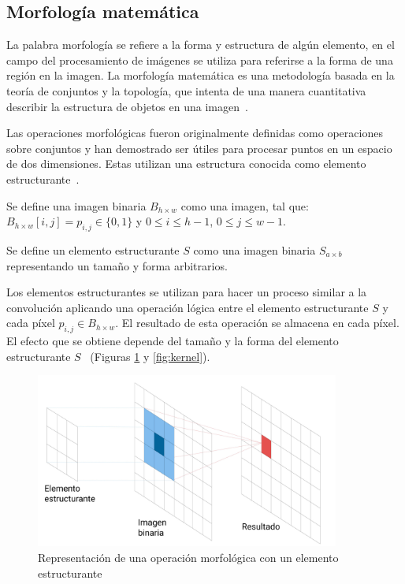 \subsection{Morfología matemática}

La palabra morfología se refiere a la forma y estructura de algún elemento, en el campo del procesamiento de imágenes se utiliza para referirse a la forma de una región en la imagen. La morfología matemática es una metodología basada en la teoría de conjuntos y la topología, que intenta de una manera cuantitativa describir la estructura de objetos en una imagen~\cite{bovik2009essential}.

Las operaciones morfológicas fueron originalmente definidas como operaciones sobre conjuntos y han demostrado ser útiles para procesar puntos en un espacio de dos dimensiones. Estas utilizan una estructura conocida como elemento estructurante~\cite{soille1999morphological, haralick1987image}.

\begin{definition}
	Se define una imagen binaria $B_{h \times w}$ como una imagen, tal que: $B_{h \times w}[i, j] = p_{i, j} \in \{0, 1\}$ y $0 \leq i \leq h - 1$, $ 0 \leq j \leq w-1$.
\end{definition}

\begin{definition}
	Se define un elemento estructurante $S$ como una imagen binaria $S_{a \times b}$ representando un tamaño y forma arbitrarios.
\end{definition}

Los elementos estructurantes se utilizan para hacer un proceso similar a la convolución aplicando una operación lógica entre el elemento estructurante $S$ y cada píxel $p_{i, j} \in B_{h \times w}$. El resultado de esta operación se almacena en cada píxel. El efecto que se obtiene depende del tamaño y la forma del elemento estructurante $S$~\cite{castleman1996digital} (Figuras \ref{fig:estructurante} y \ref{fig:kernel}).

\begin{figure}[ht]
	\centering
	\includegraphics[width=10cm]{./Graphics/estructurante.png}
	\caption{Representación de una operación morfológica con un elemento estructurante}
	\label{fig:estructurante}
\end{figure}	


